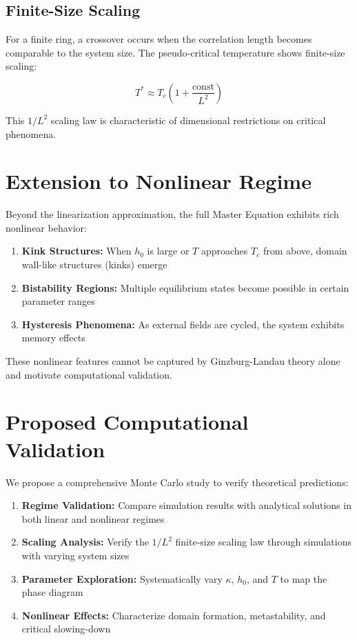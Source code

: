 \documentclass[12pt,a4paper]{article}
\begin{document}
\subsection{Finite-Size Scaling}

For a finite ring, a crossover occurs when the correlation length becomes comparable to the system size. The pseudo-critical temperature shows finite-size scaling:

\begin{equation}
    T^* \approx T_c \left( 1 + \frac{\text{const}}{L^2} \right)
\end{equation}

This $1/L^2$ scaling law is characteristic of dimensional restrictions on critical phenomena.

\section{Extension to Nonlinear Regime}

Beyond the linearization approximation, the full Master Equation exhibits rich nonlinear behavior:

\begin{enumerate}
    \item \textbf{Kink Structures:} When $h_0$ is large or $T$ approaches $T_c$ from above, domain wall-like structures (kinks) emerge
    \item \textbf{Bistability Regions:} Multiple equilibrium states become possible in certain parameter ranges
    \item \textbf{Hysteresis Phenomena:} As external fields are cycled, the system exhibits memory effects
\end{enumerate}

These nonlinear features cannot be captured by Ginzburg-Landau theory alone and motivate computational validation.

\section{Proposed Computational Validation}

We propose a comprehensive Monte Carlo study to verify theoretical predictions:

\begin{enumerate}
    \item \textbf{Regime Validation:} Compare simulation results with analytical solutions in both linear and nonlinear regimes
    \item \textbf{Scaling Analysis:} Verify the $1/L^2$ finite-size scaling law through simulations with varying system sizes
    \item \textbf{Parameter Exploration:} Systematically vary $\kappa$, $h_0$, and $T$ to map the phase diagram
    \item \textbf{Nonlinear Effects:} Characterize domain formation, metastability, and critical slowing-down
\end{enumerate}
\end{document}
